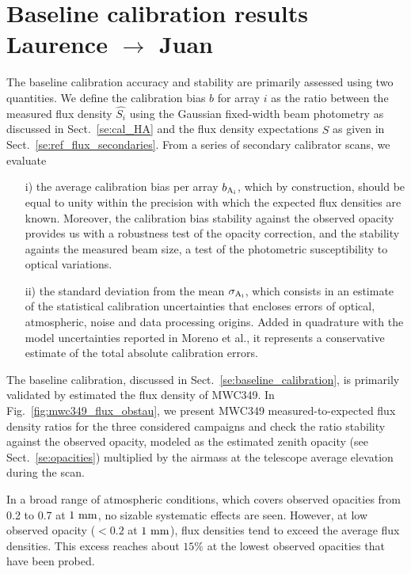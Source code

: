 %
%
%
\section{Baseline calibration results {\color{blue} Laurence $\rightarrow$ Juan}}

The baseline calibration accuracy and stability are primarily assessed
using two quantities. We define the calibration bias $b$ for array $i$ as
the ratio between the measured flux density $\hat{S_{i}}$ using the
Gaussian fixed-width beam photometry as discussed in
Sect.~\ref{se:cal_HA} and the flux density expectations $\hat{S}$ as
given in Sect.~\ref{se:ref_flux_secondaries}. From a series of
secondary calibrator scans, we evaluate
\begin{itemize}
\item[i)] the average calibration bias per array $b_{\rm A_i}$,
  which by construction, should be equal to unity within the precision
  with which the expected flux densities are known. Moreover, 
  the calibration bias stability against the observed opacity provides
  us with a robustness test of the opacity correction, and the stability
  againts the measured beam size, a test of the photometric
  susceptibility to optical variations. %
\item[ii)] the standard deviation from the mean $\sigma_{\rm A_i}$,
  which consists in an estimate of the statistical calibration
  uncertainties that encloses errors of optical, atmospheric, noise
  and data processing origins. Added in quadrature with the model
  uncertainties reported in Moreno et al., it represents a
  conservative estimate of the total absolute calibration errors.
\end{itemize}


The baseline calibration, discussed in Sect.~\ref{se:baseline_calibration}, is primarily
validated by estimated the flux density of MWC349. In
Fig.~\ref{fig:mwc349_flux_obstau}, we present MWC349
measured-to-expected flux density ratios for the three considered
campaigns and check the ratio stability against the observed opacity,
modeled as the estimated zenith opacity (see Sect.~\ref{se:opacities}) multiplied
by the airmass at the telescope average elevation during the scan. 


In a broad range of atmospheric conditions, which covers observed opacities from 0.2 to
0.7 at $1~\rm{mm}$, no sizable systematic effects are seen. However, at low observed
opacity ($<0.2$ at $1~\rm{mm}$), flux densities tend to exceed
the average flux densities. This excess reaches about $15\%$ at the
lowest observed opacities that have been probed.

